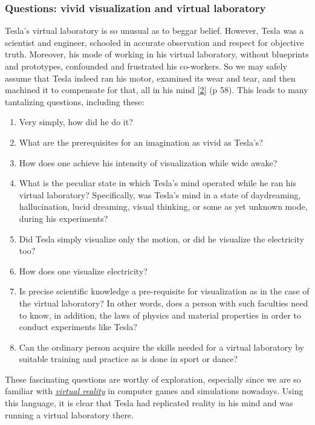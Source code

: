 \documentclass[
  a4paper,
]{article}
\providecommand{\tightlist}{%
  \setlength{\itemsep}{0pt}\setlength{\parskip}{0pt}}
\begin{document}
\hypertarget{questions-vivid-visualization-and-virtual-laboratory}{%
\subsubsection{Questions: vivid visualization and virtual
laboratory}\label{questions-vivid-visualization-and-virtual-laboratory}}

Tesla's virtual laboratory is so unusual as to beggar belief. However,
Tesla was a scientist and engineer, schooled in accurate observation and
respect for objective truth. Moreover, his mode of working in his
virtual laboratory, without blueprints and prototypes, confounded and
frustrated his co-workers. So we may safely assume that Tesla indeed ran
his motor, examined its wear and tear, and then machined it to
compensate for that, all in his mind
\protect\hyperlink{ref-oneill80}{{[}2{]}} (p 58). This leads to many
tantalizing questions, including these:

\begin{enumerate}
\tightlist
\item
  Very simply, how did he do it?
\item
  What are the prerequisites for an imagination as vivid as Tesla's?
\item
  How does one achieve his intensity of visualization while wide awake?
\item
  What is the peculiar state in which Tesla's mind operated while he ran
  his virtual laboratory? Specifically, was Tesla's mind in a state of
  daydreaming, hallucination, lucid dreaming, visual thinking, or some
  as yet unknown mode, during his experiments?
\item
  Did Tesla simply visualize only the motion, or did he visualize the
  electricity too?
\item
  How does one visualize electricity?
\item
  Is precise scientific knowledge a pre-requisite for visualization as
  in the case of the virtual laboratory? In other words, does a person
  with such faculties need to know, in addition, the laws of physics and
  material properties in order to conduct experiments like Tesla?
\item
  Can the ordinary person acquire the skills needed for a virtual
  laboratory by suitable training and practice as is done in sport or
  dance?
\end{enumerate}

These fascinating questions are worthy of exploration, especially since
we are so familiar with
\href{https://en.wikipedia.org/wiki/Virtual_reality}{\emph{virtual
reality}} in computer games and simulations nowadays. Using this
language, it is clear that Tesla had replicated reality in his mind and
was running a virtual laboratory there.
\end{document}
